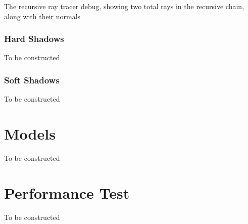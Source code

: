 \documentclass{article}
\begin{document}
\begin{center}
        The recursive ray tracer debug, showing two total rays in the recursive chain, along with their normals
    \end{center}

    \subsubsection{Hard Shadows}
    To be constructed

    \subsubsection{Soft Shadows}
    To be constructed

    \section{Models}
    To be constructed

    \section{Performance Test}
    To be constructed
\end{document}
